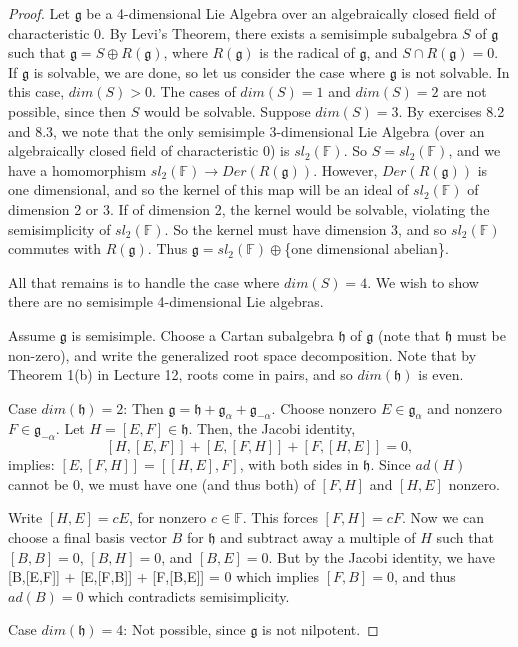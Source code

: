 \documentclass[12pt]{amsart}
\theoremstyle{definition}
\theoremstyle{definition}
\theoremstyle{definition}
\numberwithin{equation}{subsection}
\newcommand{\g}{\mathfrak{g}}
\newcommand{\h}{\mathfrak{h}}
\begin{document}
\begin{proof}
Let $\g$ be a 4-dimensional Lie Algebra over an algebraically closed field of characteristic 0.
By Levi's Theorem, there exists a semisimple subalgebra $S$ of $\g$ such that
$\g = S \oplus R(\g)$, where $R(\g)$ is the radical of $\g$, and $S \cap R(\g) = 0$.
If $\g$ is solvable, we are done, so let us consider the case where $\g$ is not solvable.
In this case, $dim(S) > 0$. The cases of $dim(S) = 1$ and $dim(S) = 2$ are not possible, since then $S$ would be solvable.
Suppose $dim(S)=3$. By exercises 8.2 and 8.3, we note that the only semisimple 3-dimensional Lie Algebra (over an algebraically
closed field of characteristic 0) is $sl_2(\mathbb{F})$.  So $S = sl_2(\mathbb{F})$, and we have a homomorphism 
$sl_2(\mathbb{F}) \longrightarrow Der(R(\g))$. However, $Der(R(\g))$ is one dimensional, and so 
the kernel of this map will be an ideal of $sl_2(\mathbb{F})$ of dimension 2 or 3. If of dimension 2, the kernel would be solvable,
violating the semisimplicity of $sl_2(\mathbb{F})$. So the kernel must have dimension 3, and so $sl_2(\mathbb{F})$ commutes
with $R(\g)$. Thus $\g = sl_2(\mathbb{F}) \oplus $\{one dimensional abelian\}.

All that remains is to handle the case where $dim(S) = 4$. We wish to show there are no semisimple 4-dimensional Lie algebras.


Assume $\g$ is semisimple.
Choose a Cartan subalgebra $\h$ of $\g$ (note that $\h$ must be non-zero), and
write the generalized root space decomposition. Note that by Theorem 1(b) in Lecture 
12, roots come in pairs, and so $dim(\h)$ is even.

\par{Case $dim(\h) = 2$:}
Then $\g = \h + \g_\alpha + \g_{-\alpha}$.
Choose nonzero $E \in \g_\alpha$ and nonzero $F \in \g_{-\alpha}$. Let $H=[E,F] \in \h$.
Then, the  Jacobi identity, 
$$[H,[E,F]] + [E,[F,H]] + [F,[H,E]] = 0,$$ 
implies: $[E,[F,H]] = [[H,E],F]$, with both sides in $\h$. Since $ad(H)$ cannot be 0, we must 
have one (and thus both) of $[F,H]$ and $[H,E]$ nonzero. 

Write $[H,E] = cE$, for nonzero $c \in \mathbb{F}$. This forces $[F,H] = cF$. Now we can choose a final basis 
vector $B$ for $\h$ and subtract away a multiple of $H$ such that $[B,B]=0$, $[B,H]=0$, and $[B,E]=0$. But by the Jacobi identity, we have
[B,[E,F]] + [E,[F,B]] + [F,[B,E]] = 0 which implies $[F,B] = 0$, and thus $ad(B)=0$ which contradicts semisimplicity.

\par{Case $dim(\h) = 4$:} 
Not possible, since $\g$ is not nilpotent.
\end{proof}
\end{document}
